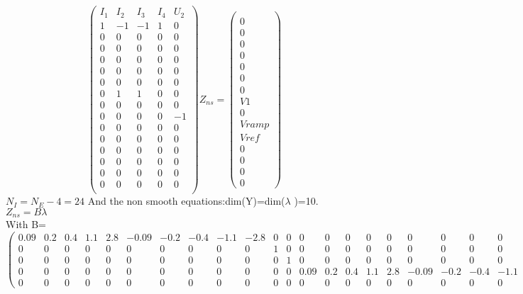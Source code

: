 \[
\left(\begin{array}{ccccc}
  I_{1}&I_{2}&I_{3}&I_{4}&U_{2}\\
  \hline
  1&-1&-1&1&0\\
  0&0&0&0&0\\
  0&0&0&0&0\\
  0&0&0&0&0\\
  0&0&0&0&0\\
  0&0&0&0&0\\
  0&1&1&0&0\\
  0&0&0&0&0\\
  0&0&0&0&-1\\
  0&0&0&0&0\\
  0&0&0&0&0\\
  0&0&0&0&0\\
  0&0&0&0&0\\
  0&0&0&0&0\\
  0&0&0&0&0\\
\end{array}\right)Z_{ns}=
\left(\begin{array}{c}
  \\
0\\0\\0\\0\\0\\0\\0\\V1\\0\\Vramp\\Vref\\0\\0\\0\\0
\end{array}\right)\]
$N_{I}=N_{E}-4=24$
\newpage
And the non smooth equations:dim(Y)=dim($\lambda$ )=10.\\
\underline{$Z_{ns}=B\lambda$}\\
With B=
\tiny
\[
\left(\begin{array}{cccccccccccccccccccccccc}
0.09&0.2&0.4&1.1&2.8&-0.09&-0.2&-0.4&-1.1&-2.8&0&0&0&0&0&0&0&0&0&0&0&0&0&0\\
0&0&0&0&0&0&0&0&0&0&1&0&0&0&0&0&0&0&0&0&0&0&0&0\\
0&0&0&0&0&0&0&0&0&0&0&1&0&0&0&0&0&0&0&0&0&0&0&0\\
0&0&0&0&0&0&0&0&0&0&0&0&0.09&0.2&0.4&1.1&2.8&-0.09&-0.2&-0.4&-1.1&-2.8&0&0\\
0&0&0&0&0&0&0&0&0&0&0&0&0&0&0&0&0&0&0&0&0&0&25&-25
\end{array}\right)\]

